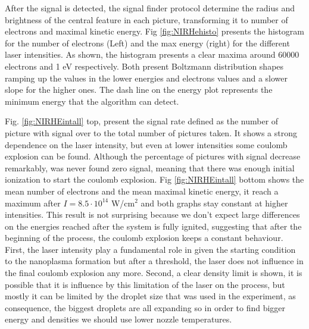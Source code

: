 After the signal is detected, the signal finder protocol determine the radius and brightness of  the central feature in each picture, transforming it to number of electrons and maximal kinetic energy. Fig \ref{fig:NIRHehisto} presents the histogram for the number of electrons (Left) and the max energy (right) for the different laser intensities. As shown, the histogram presents a clear maxima around 60000 electrons and 1 eV respectively. Both present Boltzmann distribution shapes ramping up the values in the lower energies and electrons values and a slower slope for the higher ones. The dash line on the energy plot represents the minimum energy that the algorithm can detect. 

Fig. \ref{fig:NIRHEintall} top, present the signal rate defined as the number of picture with signal over to the total number of pictures taken. It shows a strong dependence on the laser intensity, but even at lower intensities some coulomb explosion can be found. Although the percentage of pictures with signal decrease remarkably, was never found zero signal, meaning that there was enough initial ionization to start the coulomb explosion. Fig \ref{fig:NIRHEintall} bottom shows the mean number of electrons and the mean maximal kinetic energy, it reach a maximum after $I=8.5\cdot10^{14}$ W/cm$^{2}$ and both graphs stay constant at higher intensities. This result is not surprising because we don't expect large differences on the energies reached after the system is fully ignited, suggesting that after the beginning of the process, the coulomb explosion keeps a constant behaviour. First, the laser intensity play a fundamental role in given the starting condition to the nanoplasma formation but after a threshold, the laser does not influence in the final coulomb explosion any more. Second, a clear density limit is shown, it is possible that it is influence by this limitation of the laser on the process, but mostly it can be limited by the droplet size that was used in the experiment, as consequence, the biggest droplets are all expanding so in order to find bigger energy and densities we should use lower nozzle temperatures.  

